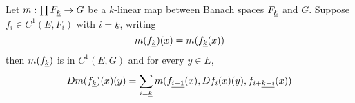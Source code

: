 \documentclass[../main-manifolds.tex]{subfiles}
\begin{document}
\begin{wts}\label{prop:differentiating-linear-maps}
    
\end{wts}
\begin{wts}\label{prop:product-rule-k-variables}
    Let $m: \prod \UL{F}[k]\to G$ be a $k$-linear map between Banach spaces $\UL{F}[k]$ and $G$. Suppose $f_i\in C^1(E, F_i)$ with $i=\underline{k}$, writing 
    \begin{equation}\label{eq:k-linear-multiplication-map-def}
        m(\UL{f}[k])(x) = m(\UL{f}[k](x))
    \end{equation}
    then $m(\UL{f}[k])$ is in $C^1(E,G)$ and for every $y\in E$,
    \begin{equation}\label{eq:k-linear-product-rule}
        Dm(\UL{f}[k])(x)(y) = \sum_{i=\underline{k}}m(\UL{f}[i-1](x),Df_i(x)(y),\UL{f}[i+][k-i](x))
    \end{equation}
\end{wts}
\end{document}
